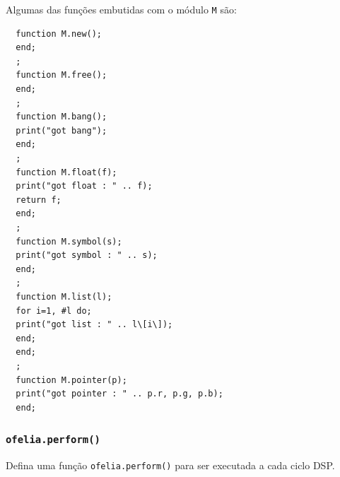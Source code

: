 \documentclass{article}
\begin{document}
Algumas das funções embutidas com o módulo \texttt{M} são:

\begin{center}
  \begin{lstlisting}
  function M.new();
  end;
  ;
  function M.free();
  end;
  ;
  function M.bang();
  print("got bang");
  end;
  ;
  function M.float(f);
  print("got float : " .. f);
  return f;
  end;
  ;
  function M.symbol(s);
  print("got symbol : " .. s);
  end;
  ;
  function M.list(l);
  for i=1, #l do;
  print("got list : " .. l\[i\]);
  end;
  end;
  ;
  function M.pointer(p);
  print("got pointer : " .. p.r, p.g, p.b);
  end;
  \end{lstlisting}
\end{center}

\subsubsection{\texttt{ofelia.perform()}}

Defina uma função \texttt{ofelia.perform()} para ser executada a cada ciclo DSP.
\end{document}
